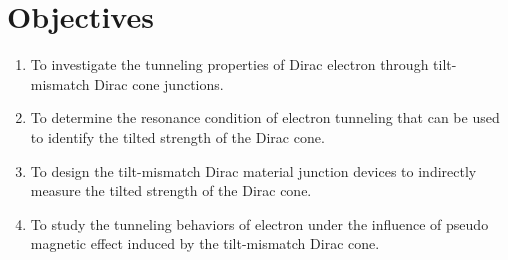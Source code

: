 \section{Objectives}
    \begin{enumerate}
        \item To investigate the tunneling properties of Dirac electron through tilt-mismatch Dirac cone junctions.
        \item To determine the resonance condition of electron tunneling that can be used to identify the tilted strength of the Dirac cone.
        \item To design the tilt-mismatch Dirac material junction devices to indirectly measure the tilted strength of the Dirac cone.
        \item To study the tunneling behaviors of electron under the influence of pseudo magnetic effect induced by the tilt-mismatch Dirac cone.  
    \end{enumerate}
    



